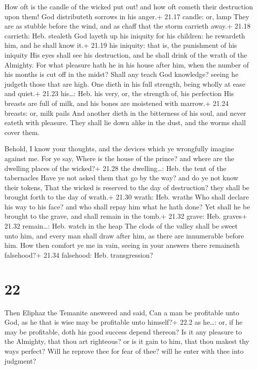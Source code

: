  How oft is the candle of the wicked put out! and how oft
cometh their destruction upon them! God distributeth sorrows in his
anger.+ 21.17 candle: or, lamp  They are as stubble before
the wind, and as chaff that the storm carrieth away.+ 21.18 carrieth:
Heb. stealeth  God layeth up his iniquity for his children:
he rewardeth him, and he shall know it.+ 21.19 his iniquity: that is,
the punishment of his iniquity  His eyes shall see his
destruction, and he shall drink of the wrath of the Almighty.
 For what pleasure hath he in his house after him, when the
number of his months is cut off in the midst?  Shall any
teach God knowledge? seeing he judgeth those that are high.
 One dieth in his full strength, being wholly at ease and
quiet.+ 21.23 his\ldots: Heb. his very, or, the strength of, his
perfection  His breasts are full of milk, and his bones are
moistened with marrow.+ 21.24 breasts: or, milk pails  And
another dieth in the bitterness of his soul, and never eateth with
pleasure.  They shall lie down alike in the dust, and the
worms shall cover them.

 Behold, I know your thoughts, and the devices which ye
wrongfully imagine against me.  For ye say, Where is the
house of the prince? and where are the dwelling places of the wicked?+
21.28 the dwelling\ldots: Heb. the tent of the tabernacles 
Have ye not asked them that go by the way? and do ye not know their
tokens,  That the wicked is reserved to the day of
destruction? they shall be brought forth to the day of wrath.+ 21.30
wrath: Heb. wraths  Who shall declare his way to his face?
and who shall repay him what he hath done?  Yet shall he be
brought to the grave, and shall remain in the tomb.+ 21.32 grave: Heb.
graves+ 21.32 remain\ldots: Heb. watch in the heap  The
clods of the valley shall be sweet unto him, and every man shall draw
after him, as there are innumerable before him.  How then
comfort ye me in vain, seeing in your answers there remaineth
falsehood?+ 21.34 falsehood: Heb. transgression?

\hypertarget{section-21}{%
\section{22}\label{section-21}}

 Then Eliphaz the Temanite answered and said, 
Can a man be profitable unto God, as he that is wise may be profitable
unto himself?+ 22.2 as he\ldots: or, if he may be profitable, doth his
good success depend thereon?  Is it any pleasure to the
Almighty, that thou art righteous? or is it gain to him, that thou
makest thy ways perfect?  Will he reprove thee for fear of
thee? will he enter with thee into judgment?

